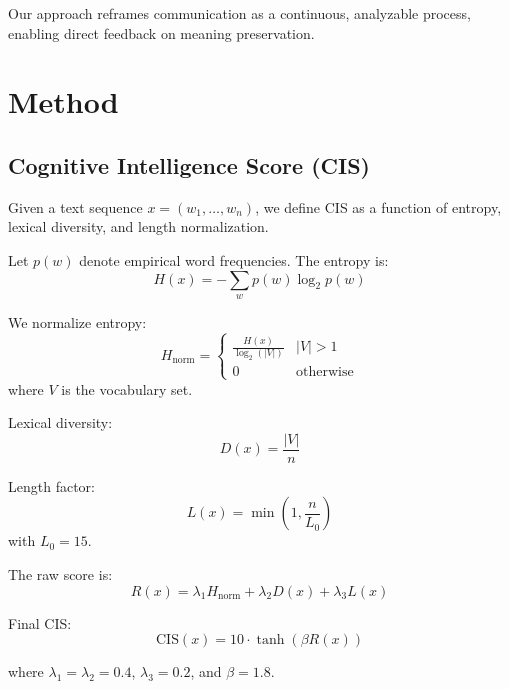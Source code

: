 \documentclass{article}
\begin{document}
Our approach reframes communication as a continuous, analyzable process, enabling direct feedback on meaning preservation.

\section{Method}

\subsection{Cognitive Intelligence Score (CIS)}

Given a text sequence $x = (w_1, \dots, w_n)$, we define CIS as a function of entropy, lexical diversity, and length normalization.

Let $p(w)$ denote empirical word frequencies. The entropy is:
\begin{equation}
H(x) = -\sum_{w} p(w) \log_2 p(w)
\end{equation}

We normalize entropy:
\begin{equation}
H_{\text{norm}} = 
\begin{cases}
\frac{H(x)}{\log_2(|V|)} & |V| > 1 \\
0 & \text{otherwise}
\end{cases}
\end{equation}
where $V$ is the vocabulary set.

Lexical diversity:
\begin{equation}
D(x) = \frac{|V|}{n}
\end{equation}

Length factor:
\begin{equation}
L(x) = \min\left(1, \frac{n}{L_0}\right)
\end{equation}
with $L_0 = 15$.

The raw score is:
\begin{equation}
R(x) = \lambda_1 H_{\text{norm}} + \lambda_2 D(x) + \lambda_3 L(x)
\end{equation}

Final CIS:
\begin{equation}
\text{CIS}(x) = 10 \cdot \tanh(\beta R(x))
\end{equation}

where $\lambda_1 = \lambda_2 = 0.4$, $\lambda_3 = 0.2$, and $\beta = 1.8$.
\end{document}
